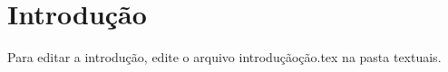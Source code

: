 \chapter{Introdução}
Para editar a introdução, edite o arquivo introduçãoção.tex na pasta textuais. 
